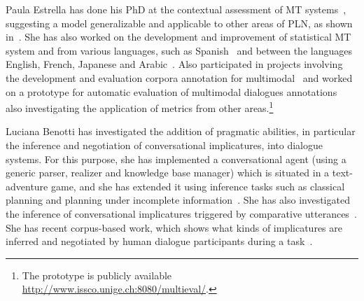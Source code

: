 Paula Estrella has done his PhD at the contextual assessment of MT
systems~\cite{estr:impr08,estr:femt09}, suggesting a model generalizable and
applicable to other areas of PLN, as shown in~\cite{Miller2008}. She has also
worked on the development and improvement of
statistical MT system and from various languages, such as
Spanish~\cite{estr:expe05} and between the languages English, French, Japanese
and Arabic~\cite{rayner-EtAl:2009:GEAF}. Also participated in projects involving
the development and evaluation
corpora annotation for multimodal~\cite{pope:estr07} and worked on
a prototype for automatic evaluation of multimodal dialogues
annotations~\cite{multieval} also investigating the application of metrics from
other areas.\footnote{The prototype is publicly available
\url{http://www.issco.unige.ch:8080/multieval/}.}


Luciana Benotti has investigated the addition of pragmatic abilities, in
particular the inference and negotiation of conversational implicatures, into
dialogue systems. For this purpose, she has implemented a conversational agent
(using a generic parser, realizer and knowledge base manager) which  is situated
in a text-adventure game, and she has extended it using inference tasks such as
classical planning and planning under incomplete information~\cite{benotti09b}.
She has also investigated the inference of conversational implicatures triggered
by comparative utterances~\cite{benotti09a}. She has recent
corpus-based work, which shows what kinds of implicatures are inferred and
negotiated by human dialogue participants during a task~\cite{benotti09c}. 






